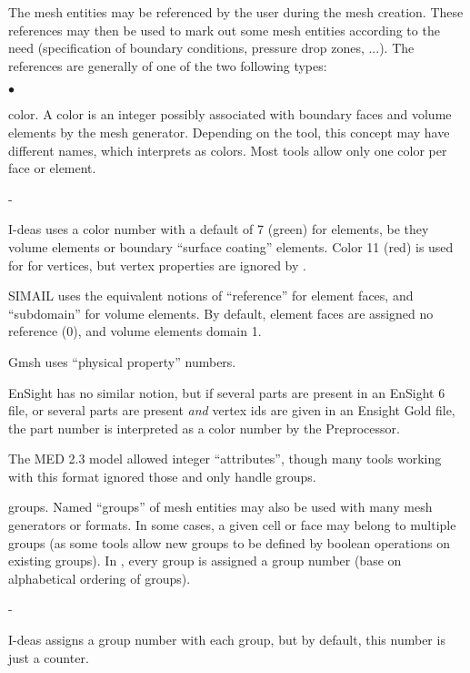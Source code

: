 {{{The mesh entities may be referenced by the user during the mesh
creation. These references may then be used to mark out some mesh entities
according to the need (specification of boundary conditions, pressure
drop zones, ...). The references are generally of one of the two
following types:
\begin{list}{$\bullet$}{}
\item color.
A color is an integer possibly associated with boundary faces and
volume elements by the mesh generator. Depending on the tool,
this concept may have different names, which \CS interprets
as colors. Most tools allow only one color per face or element.
      \begin{list}{-}{}
      \item I-deas uses a color number with a default of
            7 (green) for elements, be they volume elements or boundary
            ``surface coating'' elements. Color 11 (red) is used for
            for vertices, but vertex properties are ignored by \CS.
      \item SIMAIL uses the equivalent notions of ``reference''
            for element faces, and ``subdomain'' for volume elements.
            By default, element faces are assigned no reference (0),
            and volume elements domain 1.
      \item Gmsh uses ``physical property'' numbers.
      \item EnSight has no similar notion, but if several parts
            are present in an EnSight 6 file, or several parts
            are present \emph{and} vertex ids are given in an
            Ensight Gold file, the part number is interpreted as
            a color number by the Preprocessor.
      \item The MED 2.3 model allowed integer ``attributes'', though
            many tools working with this format ignored those
            and only handle groups.
      \end{list}
\item groups.
Named ``groups'' of mesh entities may also be used with many
mesh generators or formats. In some cases, a given cell or face may belong
to multiple groups (as some tools allow new groups to be defined
by boolean operations on existing groups).
In \CS, every group is assigned a group number (base on alphabetical
ordering of groups).
      \begin{list}{-}{}
      \item I-deas assigns a group number with each
            group, but by default, this number is just a counter.

\end{list}
\end{list}}}}
